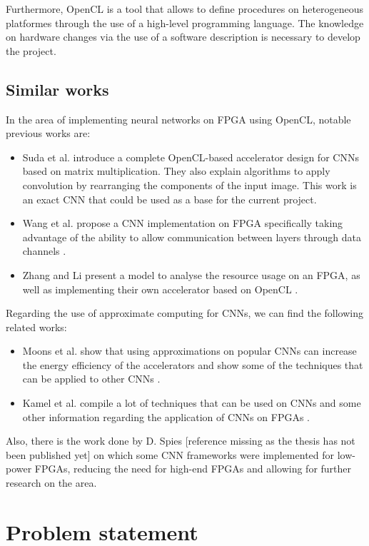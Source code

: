 Furthermore, OpenCL is a tool that allows to define procedures on heterogeneous platformes through the 
use of a high-level programming language. The knowledge on hardware changes via the use of a software 
description is necessary to develop the project.

\subsection{Similar works}

In the area of implementing neural networks on FPGA using OpenCL, notable previous works are:
\begin{itemize}
    \item Suda et al. introduce a complete OpenCL-based accelerator design for CNNs based on
    matrix multiplication. They also explain algorithms to apply convolution by rearranging
    the components of the input image. This work is an exact CNN that could be used as a base
    for the current project. \cite{suda}
    \item Wang et al. propose a CNN implementation on FPGA specifically taking advantage of 
    the ability to allow communication between layers through data channels \cite{pipecnn}.
    \item Zhang and Li present a model to analyse the resource usage on an FPGA, as well as
    implementing their own accelerator based on OpenCL \cite{zhangcnn}.
\end{itemize}

Regarding the use of approximate computing for CNNs, we can find the following related works:
\begin{itemize}
    \item Moons et al. show that using approximations on popular CNNs can increase the energy
    efficiency of the accelerators and show some of the techniques that can be applied to other
    CNNs \cite{moons}.
    \item Kamel et al. compile a lot of techniques that can be used on CNNs and some other 
    information regarding the application of CNNs on FPGAs \cite{kamel}.
\end{itemize}

Also, there is the work done by D. Spies [reference missing as the thesis has not been published yet]
on which some CNN frameworks were implemented for low-power FPGAs, reducing the need for high-end
FPGAs and allowing for further research on the area.

\section{Problem statement}

